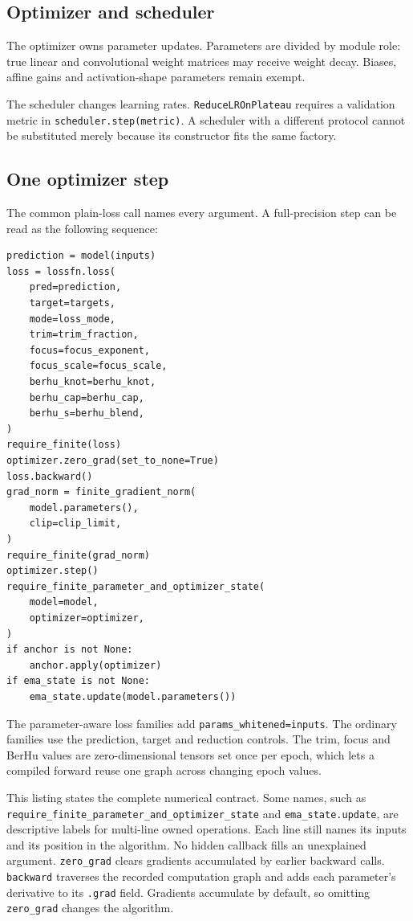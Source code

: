 \documentclass[10pt,aps,prd,twocolumn,nofootinbib]{revtex4-2}
\newcommand{\code}[1]{\texttt{#1}}
\begin{document}
\subsection{Optimizer and scheduler}

The optimizer owns parameter updates.  Parameters are divided by module role:
true linear and convolutional weight matrices may receive weight decay.
Biases, affine gains and activation-shape parameters remain exempt.

The scheduler changes learning rates.  \code{ReduceLROnPlateau} requires a
validation metric in \code{scheduler.step(metric)}.  A scheduler with a
different protocol cannot be substituted merely because its constructor fits
the same factory.

\subsection{One optimizer step}

The common plain-loss call names every argument.  A full-precision step can be
read as the following sequence:
\begin{verbatim}
prediction = model(inputs)
loss = lossfn.loss(
    pred=prediction,
    target=targets,
    mode=loss_mode,
    trim=trim_fraction,
    focus=focus_exponent,
    focus_scale=focus_scale,
    berhu_knot=berhu_knot,
    berhu_cap=berhu_cap,
    berhu_s=berhu_blend,
)
require_finite(loss)
optimizer.zero_grad(set_to_none=True)
loss.backward()
grad_norm = finite_gradient_norm(
    model.parameters(),
    clip=clip_limit,
)
require_finite(grad_norm)
optimizer.step()
require_finite_parameter_and_optimizer_state(
    model=model,
    optimizer=optimizer,
)
if anchor is not None:
    anchor.apply(optimizer)
if ema_state is not None:
    ema_state.update(model.parameters())
\end{verbatim}
The parameter-aware loss families add
\code{params\_whitened=inputs}.  The ordinary families use the prediction,
target and reduction controls.  The trim, focus and BerHu values are
zero-dimensional tensors set once per epoch, which lets a compiled forward
reuse one graph across changing epoch values.

This listing states the complete numerical contract.  Some names, such as
\code{require\_finite\_parameter\_and\_optimizer\_state} and
\code{ema\_state.update}, are descriptive labels for multi-line owned
operations.  Each line still names its inputs and its
position in the algorithm.  No hidden callback fills an unexplained argument.
\code{zero\_grad} clears gradients accumulated by earlier backward calls.
\code{backward} traverses the recorded computation graph and adds each
parameter's derivative to its \code{.grad} field.  Gradients accumulate by
default, so omitting \code{zero\_grad} changes the algorithm.
\end{document}

